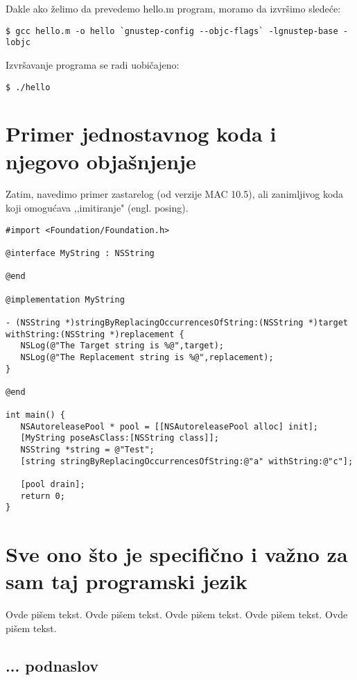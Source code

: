 \documentclass[a4paper]{article}
\begin{document}
{Dakle ako želimo da prevedemo hello.m program, moramo da izvršimo sledeće:
\begin{lstlisting}[frame=single]
$ gcc hello.m -o hello `gnustep-config --objc-flags` -lgnustep-base -lobjc
\end{lstlisting}

Izvršavanje programa se radi uobičajeno:
\begin{lstlisting}[frame=single]
$ ./hello
\end{lstlisting}

\section{Primer jednostavnog koda i njegovo objašnjenje}
\label{sec:primer}

Zatim, navedimo primer zastarelog (od verzije MAC 10.5), ali zanimljivog koda koji omogućava ,,imitiranje" (engl. posing). 

\begin{lstlisting}[frame=single]
#import <Foundation/Foundation.h>

@interface MyString : NSString

@end

@implementation MyString

- (NSString *)stringByReplacingOccurrencesOfString:(NSString *)target
withString:(NSString *)replacement {
   NSLog(@"The Target string is %@",target);
   NSLog(@"The Replacement string is %@",replacement);
}

@end

int main() {
   NSAutoreleasePool * pool = [[NSAutoreleasePool alloc] init];
   [MyString poseAsClass:[NSString class]];
   NSString *string = @"Test";
   [string stringByReplacingOccurrencesOfString:@"a" withString:@"c"];
   
   [pool drain];
   return 0;
}
\end{lstlisting}

\section{Sve ono što je specifično i važno za sam taj programski jezik}
\label{sec:naslovN}

Ovde pišem tekst. 
Ovde pišem tekst. 
Ovde pišem tekst. 
Ovde pišem tekst. 
Ovde pišem tekst. 

\subsection{... podnaslov}
\label{subsec:podnaslovK}

}
\end{document}
